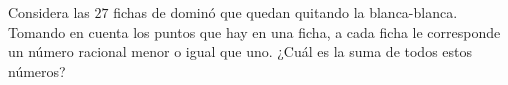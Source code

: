 Considera las $27$ fichas de dominó que quedan quitando la blanca-blanca. Tomando en
cuenta los puntos que hay en una ficha, a cada ficha le corresponde un número racional
menor o igual que uno. ¿Cuál es la suma de todos estos números?